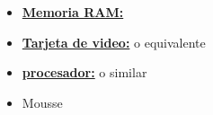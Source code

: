 \begin{itemize}
    \item \underline{\textbf{Memoria RAM:}} 
    \item \underline{\textbf{Tarjeta de video:}}  o equivalente
    \item \underline{\textbf{procesador:}}  o similar
    \item Mousse
\end{itemize}